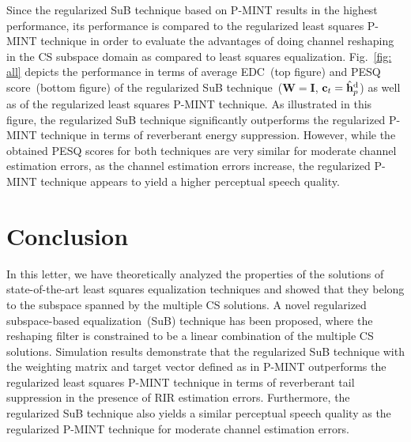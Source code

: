 \documentclass[11pt,draftcls,onecolumn]{IEEEtran}
\begin{document}
Since the regularized SuB technique based on P-MINT results in the highest performance, its performance is compared to the regularized least squares P-MINT technique in order to evaluate the advantages of doing channel reshaping in the CS subspace domain as compared to least squares equalization.
Fig.~\ref{fig: all} depicts the performance in terms of average EDC~(top figure) and PESQ score~(bottom figure) of the regularized SuB technique~($\mathbf{W} = \mathbf{I}$, $\mathbf{c}_t = \hat{\mathbf{h}}_p^{\rm d}$) as well as of the regularized least squares P-MINT technique.
As illustrated in this figure, the regularized SuB technique significantly outperforms the regularized P-MINT technique in terms of reverberant energy suppression.
However, while the obtained PESQ scores for both techniques are very similar for moderate channel estimation errors, as the channel estimation errors increase, the regularized P-MINT technique appears to yield a higher perceptual speech quality.
\section{Conclusion}
In this letter, we have theoretically analyzed the properties of the solutions of state-of-the-art least squares equalization techniques and showed that they belong to the subspace spanned by the multiple CS solutions.
A novel regularized subspace-based equalization~(SuB) technique has been proposed, where the reshaping filter is constrained to be a linear combination of the multiple CS solutions.
Simulation results demonstrate that the regularized SuB technique with the weighting matrix and target vector defined as in P-MINT outperforms the regularized least squares P-MINT technique in terms of reverberant tail suppression in the presence of RIR estimation errors.
Furthermore, the regularized SuB technique also yields a similar perceptual speech quality as the regularized P-MINT technique for moderate channel estimation errors.


\end{document}
